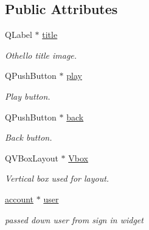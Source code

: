\subsection*{Public Attributes}
\begin{DoxyCompactItemize}
\item 
\mbox{\label{classgame2menu_ad425f6fa5fc38be976fde532f173b202}} 
Q\+Label $\ast$ \hyperlink{classgame2menu_ad425f6fa5fc38be976fde532f173b202}{title}
\begin{DoxyCompactList}\small\item\em Othello title image. \end{DoxyCompactList}\item 
\mbox{\label{classgame2menu_a3d3484e23586e4219eeefabbc0203afb}} 
Q\+Push\+Button $\ast$ \hyperlink{classgame2menu_a3d3484e23586e4219eeefabbc0203afb}{play}
\begin{DoxyCompactList}\small\item\em Play button. \end{DoxyCompactList}\item 
\mbox{\label{classgame2menu_a6015c161e82f886cc9193f397b03a24d}} 
Q\+Push\+Button $\ast$ \hyperlink{classgame2menu_a6015c161e82f886cc9193f397b03a24d}{back}
\begin{DoxyCompactList}\small\item\em Back button. \end{DoxyCompactList}\item 
\mbox{\label{classgame2menu_a2f79ea6f000654ef0092f4d4b9364382}} 
Q\+V\+Box\+Layout $\ast$ \hyperlink{classgame2menu_a2f79ea6f000654ef0092f4d4b9364382}{Vbox}
\begin{DoxyCompactList}\small\item\em Vertical box used for layout. \end{DoxyCompactList}\item 
\mbox{\label{classgame2menu_a081baa426df4a4a194314316e1451dc3}} 
\hyperlink{classaccount}{account} $\ast$ \hyperlink{classgame2menu_a081baa426df4a4a194314316e1451dc3}{user}
\begin{DoxyCompactList}\small\item\em passed down user from sign in widget \end{DoxyCompactList}\end{DoxyCompactItemize}


